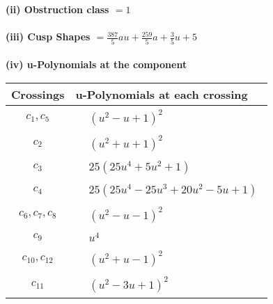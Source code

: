 \documentclass[1p]{elsarticle_modified}
\theoremstyle{definition}
\begin{document}
\flushleft \textbf{(ii) Obstruction class $= 1$}\\~\\
\flushleft \textbf{(iii) Cusp Shapes $= \frac{387}{5} a u+\frac{259}{5} a+\frac{3}{5} u+5$}\\~\\
\newpage\renewcommand{\arraystretch}{1}
\flushleft \textbf{(iv) u-Polynomials at the component}\newline \\
\begin{tabular}{m{50pt}|m{274pt}}
Crossings & \hspace{64pt}u-Polynomials at each crossing \\
\hline $$\begin{aligned}c_{1},c_{5}\end{aligned}$$&$\begin{aligned}
&(u^2- u+1)^2
\end{aligned}$\\
\hline $$\begin{aligned}c_{2}\end{aligned}$$&$\begin{aligned}
&(u^2+u+1)^2
\end{aligned}$\\
\hline $$\begin{aligned}c_{3}\end{aligned}$$&$\begin{aligned}
&25(25 u^4+5 u^2+1)
\end{aligned}$\\
\hline $$\begin{aligned}c_{4}\end{aligned}$$&$\begin{aligned}
&25(25 u^4-25 u^3+20 u^2-5 u+1)
\end{aligned}$\\
\hline $$\begin{aligned}c_{6},c_{7},c_{8}\end{aligned}$$&$\begin{aligned}
&(u^2- u-1)^2
\end{aligned}$\\
\hline $$\begin{aligned}c_{9}\end{aligned}$$&$\begin{aligned}
&u^4
\end{aligned}$\\
\hline $$\begin{aligned}c_{10},c_{12}\end{aligned}$$&$\begin{aligned}
&(u^2+u-1)^2
\end{aligned}$\\
\hline $$\begin{aligned}c_{11}\end{aligned}$$&$\begin{aligned}
&(u^2-3 u+1)^2
\end{aligned}$\\
\hline
\end{tabular}\\~\\
\end{document}
